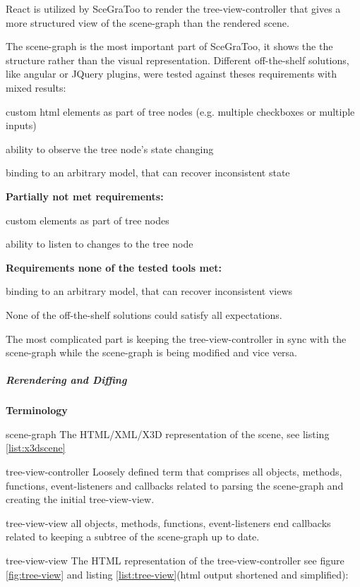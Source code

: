 React is utilized by SceGraToo to render the tree-view-controller that
gives a more structured view of the scene-graph than the rendered scene.

The scene-graph is the most important part of SceGraToo, it shows the
the structure rather than the visual representation. Different
off-the-shelf solutions, like angular or JQuery plugins, were tested
against theses requirements with mixed results:

\begin{enumerate*}
  \item custom html elements as part of tree nodes (e.g. multiple checkboxes or multiple inputs)
  \item ability to observe the tree node's state changing
  \item binding to an arbitrary model, that can recover inconsistent state
\end{enumerate*}

\textbf{Partially not met requirements:}

\begin{itemize*}
  \item custom elements as part of tree nodes
  \item ability to listen to changes to the tree node
\end{itemize*}

\textbf{Requirements none of the tested tools met:}

\begin{itemize*}
  \item binding to an arbitrary model, that can recover inconsistent views
\end{itemize*}

None of the off-the-shelf solutions could satisfy all expectations.

The most complicated part is keeping the tree-view-controller in sync
with the scene-graph while the scene-graph is being modified and vice
versa.

\clearpage
\subparagraph{Rerendering and Diffing}
\label{rerendering-and-diffing}

\textbf{Terminology}

\begin{description*}
  \item[scene-graph]
    The HTML/XML/X3D representation of the scene, see listing \ref{list:x3dscene}
  \item[tree-view-controller]
    Loosely defined term that comprises all objects, methods, functions,
    event-listeners and callbacks related to parsing the scene-graph and
    creating the initial tree-view-view.
  \item[tree-view-view]
    all objects, methods, functions, event-listeners end callbacks related
    to keeping a subtree of the scene-graph up to date.
  \item[tree-view-view]
    The HTML representation of the tree-view-controller see figure \ref{fig:tree-view} and listing \ref{list:tree-view}(html output
    shortened and simplified):\\
\end{description*}

